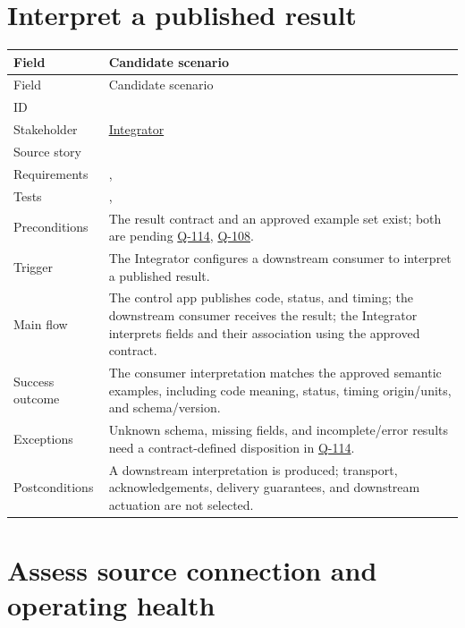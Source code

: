 \section{Interpret a published result}

\small
\begin{tabularx}{\linewidth}{L{2.8cm}Y}
\caption{Interpret a published result Use Case\label{Table:UC-102}}\\
\toprule
Field & Candidate scenario\\\midrule
\endfirsthead
\toprule
Field & Candidate scenario\\\midrule
\endhead
\bottomrule
\endlastfoot
ID & \\
Stakeholder & \hyperref[Stakeholder:Integrator]{Integrator}\\
Source story & \\
Requirements & , \\
Tests & , \\
Preconditions & The result contract and an approved example set exist; both are pending \hyperref[Question:Q-114]{Q-114}, \hyperref[Question:Q-108]{Q-108}.\\
Trigger & The Integrator configures a downstream consumer to interpret a published result.\\
Main flow & The control app publishes code, status, and timing; the downstream consumer receives the result; the Integrator interprets fields and their association using the approved contract.\\
Success outcome & The consumer interpretation matches the approved semantic examples, including code meaning, status, timing origin/units, and schema/version.\\
Exceptions & Unknown schema, missing fields, and incomplete/error results need a contract-defined disposition in \hyperref[Question:Q-114]{Q-114}.\\
Postconditions & A downstream interpretation is produced; transport, acknowledgements, delivery guarantees, and downstream actuation are not selected.\\
\end{tabularx}
\normalsize

\section{Assess source connection and operating health}

